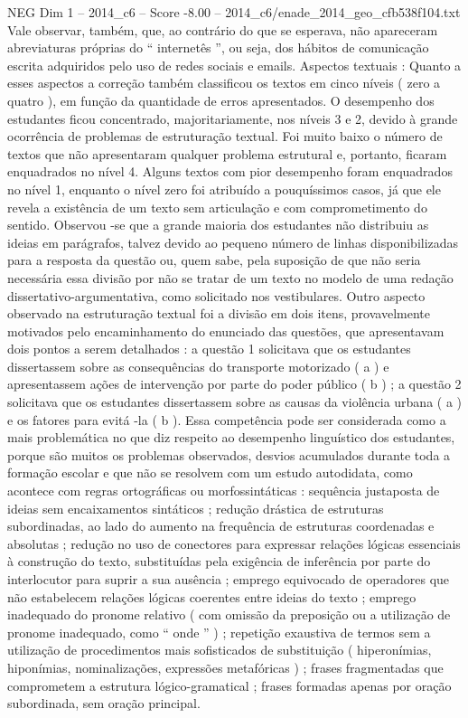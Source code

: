 \begin{textsample}{NEG Dim 1 – 2014\_c6 – Score -8.00 – 2014\_c6/enade\_2014\_geo\_cfb538f104.txt}
Vale observar, também, que, ao contrário do que se esperava, não apareceram abreviaturas próprias do “ internetês ”, ou seja, dos hábitos de comunicação escrita adquiridos pelo uso de redes sociais e emails.
Aspectos textuais : Quanto a esses aspectos a correção também classificou os textos em cinco níveis ( zero a quatro ), em função da quantidade de erros apresentados.
O desempenho dos estudantes ficou concentrado, majoritariamente, nos níveis 3 e 2, devido à grande ocorrência de problemas de estruturação textual.
Foi muito baixo o número de textos que não apresentaram qualquer problema estrutural e, portanto, ficaram enquadrados no nível 4.
Alguns textos com pior desempenho foram enquadrados no nível 1, enquanto o nível zero foi atribuído a pouquíssimos casos, já que ele revela a existência de um texto sem articulação e com comprometimento do sentido.
Observou -se que a grande maioria dos estudantes não distribuiu as ideias em parágrafos, talvez devido ao pequeno número de linhas disponibilizadas para a resposta da questão ou, quem sabe, pela suposição de que não seria necessária essa divisão por não se tratar de um texto no modelo de uma redação dissertativo-argumentativa, como solicitado nos vestibulares.
Outro aspecto observado na estruturação textual foi a divisão em dois itens, provavelmente motivados pelo encaminhamento do enunciado das questões, que apresentavam dois pontos a serem detalhados : a questão 1 solicitava que os estudantes dissertassem sobre as consequências do transporte motorizado ( a ) e apresentassem ações de intervenção por parte do poder público ( b ) ; a questão 2 solicitava que os estudantes dissertassem sobre as causas da violência urbana ( a ) e os fatores para evitá -la ( b ).
Essa competência pode ser considerada como a mais problemática no que diz respeito ao desempenho linguístico dos estudantes, porque são muitos os problemas observados, desvios acumulados durante toda a formação escolar e que não se resolvem com um estudo autodidata, como acontece com regras ortográficas ou morfossintáticas : sequência justaposta de ideias sem encaixamentos sintáticos ; redução drástica de estruturas subordinadas, ao lado do aumento na frequência de estruturas coordenadas e absolutas ; redução no uso de conectores para expressar relações lógicas essenciais à construção do texto, substituídas pela exigência de inferência por parte do interlocutor para suprir a sua ausência ; emprego equivocado de operadores que não estabelecem relações lógicas coerentes entre ideias do texto ; emprego inadequado do pronome relativo ( com omissão da preposição ou a utilização de pronome inadequado, como “ onde ” ) ; repetição exaustiva de termos sem a utilização de procedimentos mais sofisticados de substituição ( hiperonímias, hiponímias, nominalizações, expressões metafóricas ) ; frases fragmentadas que comprometem a estrutura lógico-gramatical ; frases formadas apenas por oração subordinada, sem oração principal.

\end{textsample}
